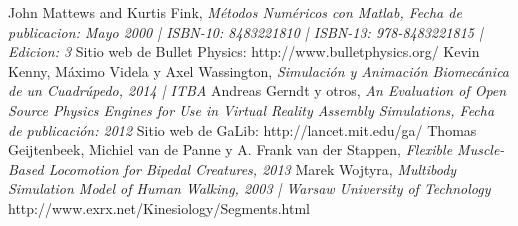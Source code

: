 \documentclass{article}
\begin{document}
\begin{thebibliography}{1}
John Mattews and Kurtis Fink, \emph{M\'etodos Num\'ericos con Matlab, Fecha de publicacion: Mayo 2000 | ISBN-10: 8483221810 | ISBN-13: 978-8483221815 | Edicion: 3}
 Sitio web de Bullet Physics: http://www.bulletphysics.org/
Kevin Kenny, M\'aximo Videla y Axel Wassington, \emph{Simulaci\'on y Animaci\'on Biomec\'anica de un Cuadr\'upedo, 2014 | ITBA}
Andreas Gerndt y otros, \emph{An Evaluation of Open Source Physics Engines for Use in Virtual Reality Assembly Simulations, Fecha de publicaci\'on: 2012}
 Sitio web de GaLib: http://lancet.mit.edu/ga/
Thomas Geijtenbeek, Michiel van de Panne y A. Frank van der Stappen, \emph{Flexible Muscle-Based Locomotion for Bipedal Creatures, 2013 }
Marek Wojtyra, \emph{Multibody Simulation Model of Human Walking, 2003 | Warsaw University of Technology}
 http://www.exrx.net/Kinesiology/Segments.html
\end{thebibliography}

\end{document}
